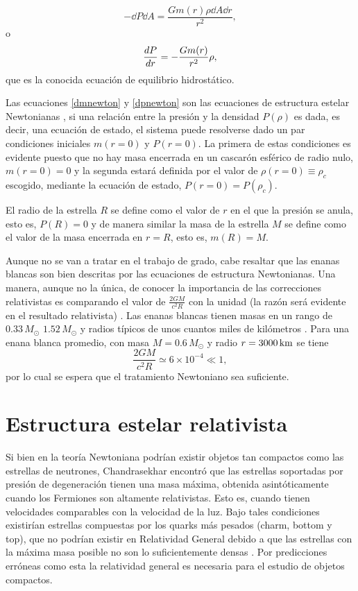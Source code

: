 \begin{equation}
    -\dd{P}\dd{A} =\frac{G m(r)\rho \dd{A} \dd{r}}{r^2},
\end{equation}
o
\begin{equation}
    \dv{P}{r} = - \frac { G m ( r ) } { r ^ { 2 } } \rho,
    \label{dpnewton}
\end{equation}
que es la conocida ecuación de equilibrio hidrostático. 

Las ecuaciones \eqref{dmnewton} y \eqref{dpnewton} son las ecuaciones de estructura estelar Newtonianas \cite{Chandrasekhar1958}, si una relación entre la presión y la densidad $P(\rho)$ es dada, es decir, una ecuación de estado, el sistema puede resolverse dado un par condiciones iniciales $m(r=0)$ y $P(r=0)$. La primera de estas condiciones es evidente puesto que no hay masa encerrada en un cascarón esférico de radio nulo, $m(r=0)=0$ y la segunda estará definida por el valor de $\rho(r=0)\equiv\rho_c$ escogido, mediante la ecuación de estado, $P(r=0)=P(\rho_c)$.

El radio de la estrella $R$ se define como el valor de $r$ en el que la presión se anula, esto es, $P(R)=0$ y de manera similar la masa de la estrella $M$ se define como el valor de la masa encerrada en $r=R$, esto es, $m(R)=M$.

Aunque no se van a tratar en el trabajo de grado, cabe resaltar que las enanas blancas son bien descritas por las ecuaciones de estructura Newtonianas. Una manera, aunque no la única, de conocer la importancia de las correcciones relativistas es comparando el valor de $\frac{2GM}{c^2R}$ con la unidad (la razón será evidente en el resultado relativista) \cite{Weinberg1972}. Las enanas blancas tienen masas en un rango de $0.33\,M_{\odot}$ $1.52\,M_{\odot}$ y radios típicos de unos cuantos miles de kilómetros \cite{Glendenning2000}. Para una enana blanca promedio, con masa $M=0.6\,M_{\odot}$ y radio $r=3000 \,\rm{km}$ se tiene
\begin{equation}
    \frac{2GM}{c^2R}\simeq 6\times 10^{-4}\ll 1,
\end{equation}
por lo cual se espera que el tratamiento Newtoniano sea suficiente. 

\section{Estructura estelar relativista}

Si bien en la teoría Newtoniana podrían existir objetos tan compactos como las estrellas de neutrones, Chandrasekhar encontró que las estrellas soportadas por presión de degeneración tienen una masa máxima, obtenida asintóticamente cuando los Fermiones son altamente relativistas. Esto es, cuando tienen velocidades comparables con la velocidad de la luz. Bajo tales condiciones existirían estrellas compuestas por los quarks más pesados (charm, bottom y top), que no podrían existir en Relatividad General debido a que las estrellas con la máxima masa posible no son lo suficientemente densas \cite{Glendenning2000}. Por predicciones erróneas como esta la relatividad general es necesaria para el estudio de objetos compactos.

